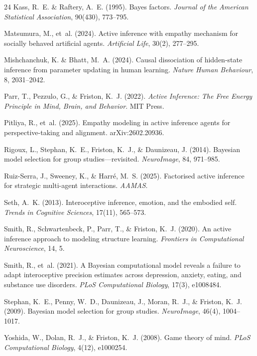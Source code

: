 \documentclass[11pt,a4paper]{article}
\begin{document}
\begin{thebibliography}{24}
Kass, R.~E. \& Raftery, A.~E. (1995).
\newblock Bayes factors.
\newblock \emph{Journal of the American Statistical Association}, 90(430), 773--795.

Matsumura, M., et~al. (2024).
\newblock Active inference with empathy mechanism for socially behaved artificial agents.
\newblock \emph{Artificial Life}, 30(2), 277--295.

Mishchanchuk, K. \& Bhatt, M.~A. (2024).
\newblock Causal dissociation of hidden-state inference from parameter updating in human learning.
\newblock \emph{Nature Human Behaviour}, 8, 2031--2042.

Parr, T., Pezzulo, G., \& Friston, K.~J. (2022).
\newblock \emph{Active Inference: The Free Energy Principle in Mind, Brain, and Behavior}.
\newblock MIT Press.

Pitliya, R., et~al. (2025).
\newblock Empathy modeling in active inference agents for perspective-taking and alignment.
\newblock arXiv:2602.20936.

Rigoux, L., Stephan, K.~E., Friston, K.~J., \& Daunizeau, J. (2014).
\newblock Bayesian model selection for group studies---revisited.
\newblock \emph{NeuroImage}, 84, 971--985.

Ruiz-Serra, J., Sweeney, K., \& Harr\'{e}, M.~S. (2025).
\newblock Factorised active inference for strategic multi-agent interactions.
\newblock \emph{AAMAS}.

Seth, A.~K. (2013).
\newblock Interoceptive inference, emotion, and the embodied self.
\newblock \emph{Trends in Cognitive Sciences}, 17(11), 565--573.

Smith, R., Schwartenbeck, P., Parr, T., \& Friston, K.~J. (2020).
\newblock An active inference approach to modeling structure learning.
\newblock \emph{Frontiers in Computational Neuroscience}, 14, 5.

Smith, R., et~al. (2021).
\newblock A {Bayesian} computational model reveals a failure to adapt interoceptive precision estimates across depression, anxiety, eating, and substance use disorders.
\newblock \emph{PLoS Computational Biology}, 17(3), e1008484.

Stephan, K.~E., Penny, W.~D., Daunizeau, J., Moran, R.~J., \& Friston, K.~J. (2009).
\newblock Bayesian model selection for group studies.
\newblock \emph{NeuroImage}, 46(4), 1004--1017.

Yoshida, W., Dolan, R.~J., \& Friston, K.~J. (2008).
\newblock Game theory of mind.
\newblock \emph{PLoS Computational Biology}, 4(12), e1000254.

\end{thebibliography}
\end{document}
